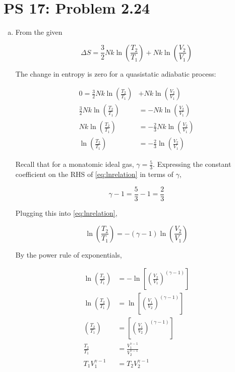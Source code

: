 \documentclass[12pt,a4paper,twocolumn]{article}
\begin{document}
\setcounter{page}{1}

\section*{PS 17: Problem 2.24}
\bigskip

\begin{enumerate}[(a)]

\item From the given

\begin{equation}\label{eq:given}
	\Delta S = \frac{3}{2} Nk \ln{\left( \frac{T_2}{T_1} \right)} + Nk \ln{\left(  \frac{V_2}{V_1} \right)}
\end{equation}

The change in entropy is zero for a quasistatic adiabatic process:

\begin{align}
	0 = \frac{3}{2} Nk \ln{\left( \frac{T_2}{T_1} \right)} &+ Nk \ln{\left(  \frac{V_2}{V_1} \right)} \\
	\frac{3}{2} Nk \ln{\left( \frac{T_2}{T_1} \right)} &= -Nk \ln{\left(  \frac{V_2}{V_1} \right)} \\
	Nk \ln{\left( \frac{T_2}{T_1} \right)} &= -\frac{2}{3} Nk \ln{\left(  \frac{V_2}{V_1} \right)} \\
	\ln{\left( \frac{T_2}{T_1} \right)} &= -\frac{2}{3} \ln{\left(  \frac{V_2}{V_1} \right)} \label{eq:lnrelation}
\end{align}

Recall that for a monatomic ideal gas, $\gamma = \frac{5}{3}$. Expressing the constant coefficient on the RHS of \eqref{eq:lnrelation} in terms of $\gamma$,

\begin{equation}\label{eq:gammarelation}
	\gamma - 1 = \frac{5}{3} - 1 = \frac{2}{3}
\end{equation}

Plugging this into \eqref{eq:lnrelation},

\begin{equation}
	\ln{\left( \frac{T_2}{T_1} \right)} = -\left( \gamma - 1 \right) \ln{\left(  \frac{V_2}{V_1} \right)}
\end{equation}

By the power rule of exponentials,

\begin{align}
	\ln{\left( \frac{T_2}{T_1} \right)} &= -\ln{ \left[ \left( \frac{V_2}{V_1} \right)^{\left( \gamma - 1 \right) } \right] } \\
	\ln{\left( \frac{T_2}{T_1} \right)} &= \ln{ \left[ \left( \frac{V_1}{V_2} \right)^{\left( \gamma - 1 \right) } \right] } \\
	\left( \frac{T_2}{T_1} \right) &= \left[ \left( \frac{V_1}{V_2} \right)^{\left( \gamma - 1 \right) } \right] \\
	\frac{T_2}{T_1} &= \frac{V_1^{\gamma - 1}}{V_2^{\gamma - 1}} \\
	T_1 V_1^{\gamma - 1} &= T_2 V_2^{\gamma - 1}
\end{align}


\end{enumerate}
\end{document}
